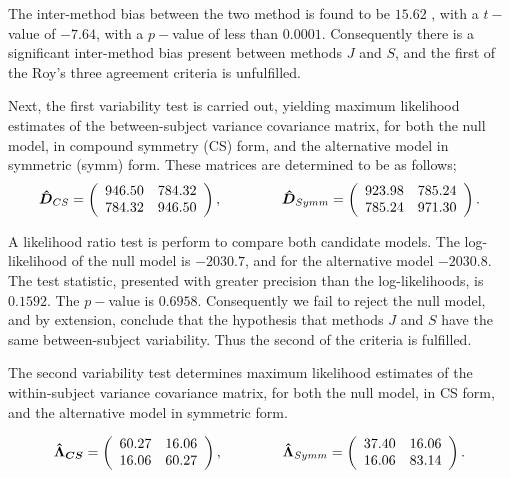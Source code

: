 \documentclass[12pt, a4paper]{report}
\theoremstyle{plain}
\theoremstyle{definition}
\theoremstyle{remark}
\begin{document}
The inter-method bias between the two method is found to be $15.62$ , with a $t-$value of $-7.64$, with a $p-$value of less than $0.0001$. Consequently there is a significant inter-method bias present between methods $J$ and $S$, and the first of the Roy's three agreement criteria is unfulfilled.

Next, the first variability test is carried out, yielding maximum likelihood estimates of the between-subject variance covariance matrix, for both the null model, in compound symmetry (CS) form, and the alternative model in symmetric (symm) form. These matrices are determined to be as follows;
\[
\boldsymbol{\hat{D}}_{CS} = \left( \begin{array}{cc}
    946.50 & 784.32  \\
    784.32 & 946.50  \\
    \end{array}\right),
\hspace{1.5cm}
    \boldsymbol{\hat{D}}_{Symm} = \left( \begin{array}{cc}
    923.98 & 785.24  \\
    785.24 & 971.30  \\
    \end{array}\right).
\]

A likelihood ratio test is perform to compare both candidate models. The log-likelihood of the null model is $-2030.7$, and for the alternative model $-2030.8$. The test statistic, presented with greater precision than the log-likelihoods, is $0.1592$. The $p-$value is $0.6958$. Consequently we fail to reject the null model, and by extension, conclude that the hypothesis that methods $J$ and $S$ have the same between-subject variability. Thus the second of the criteria is fulfilled.

The second variability test determines maximum likelihood estimates of the within-subject variance covariance matrix, for both the null model, in CS form, and the alternative model in symmetric form.

\[
\boldsymbol{\hat{\Lambda}_{CS}} = \left( \begin{array}{cc}
    60.27  & 16.06  \\
    16.06  & 60.27  \\
    \end{array}\right),
\hspace{1.5cm}
\boldsymbol{\hat{\Lambda}}_{Symm} = \left( \begin{array}{cc}
    37.40 & 16.06  \\
    16.06 & 83.14  \\
    \end{array}\right).
\]
\end{document}
